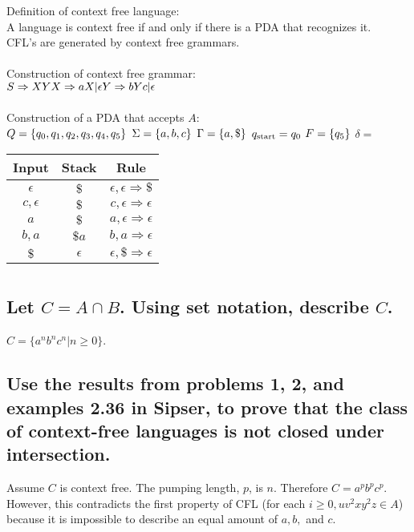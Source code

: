 \documentclass{article}
\begin{document}
Definition of context free language: \\
A language is context free if and only if there is a PDA that recognizes it. \\
CFL's are generated by context free grammars.
\\
\\
Construction of context free grammar: \\
$
    S \Rightarrow XY \\
    X \Rightarrow aX|\epsilon \\
    Y \Rightarrow bYc|\epsilon
$
\\
\\
Construction of a PDA that accepts $A$: \\
$Q = \{q_0, q_1, q_2, q_3, q_4, q_5\} \\$
$\Sigma = \{a, b, c\} \\$
$\Gamma = \{a, \$\} \\$
$q_{\text{start}} = q_0 \\$
$F = \{q_5\} \\$
$\delta =$
\begin{tabular}{ |c|c|c| }
    Input         & Stack      & Rule                                \\
    \hline
    $\epsilon$    & $\$$       & $\epsilon, \epsilon \Rightarrow \$$ \\
    $c, \epsilon$ & $\$$       & $c, \epsilon \Rightarrow \epsilon$  \\
    $a$           & $\$$       & $a, \epsilon \Rightarrow \epsilon$  \\
    $b, a$        & $\$a$      & $b, a \Rightarrow \epsilon$         \\
    $\$$          & $\epsilon$ & $\epsilon, \$ \Rightarrow \epsilon$ \\
\end{tabular}

\pagebreak

\section{}

\subsection{Let $C = A \cap B$. Using set notation, describe $C$.}

$C = \{a^n b^n c^n | n \ge 0 \}$.

\subsection{Use the results from problems 1, 2, and examples 2.36 in Sipser, to prove that the class of context-free languages is not closed under intersection.}

Assume $C$ is context free. The pumping length, $p$, is $n$. Therefore $C = a^p b^p c^p$. \\
However, this contradicts the first property of CFL (for each $i \ge 0, u v^2 x y^2 z \in A$) because it is impossible to describe an equal amount of $a, b,$ and $c$.
\end{document}

